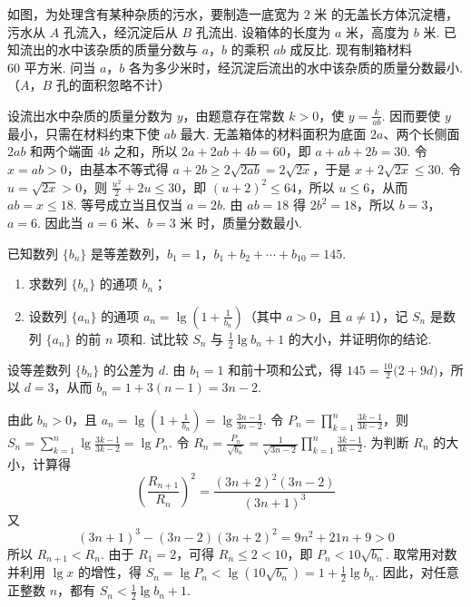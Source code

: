\documentclass[UTF8,a4paper,oneside,11pt]{ctexbook}
\begin{document}
\begin{problem}
如图，为处理含有某种杂质的污水，要制造一底宽为 \(2\text{ 米}\) 的无盖长方体沉淀槽，污水从 \(A\) 孔流入，经沉淀后从 \(B\) 孔流出. 设箱体的长度为 \(a\text{ 米}\)，高度为 \(b\text{ 米}\). 已知流出的水中该杂质的质量分数与 \(a\)，\(b\) 的乘积 \(ab\) 成反比. 现有制箱材料 \(60\text{ 平方米}\). 问当 \(a\)，\(b\) 各为多少米时，经沉淀后流出的水中该杂质的质量分数最小.（\(A\)，\(B\) 孔的面积忽略不计）

\end{problem}

\begin{solution}
设流出水中杂质的质量分数为 \(y\)，由题意存在常数 \(k>0\)，使 \(y=\frac{k}{ab}\). 因而要使 \(y\) 最小，只需在材料约束下使 \(ab\) 最大. 无盖箱体的材料面积为底面 \(2a\)、两个长侧面 \(2ab\) 和两个端面 \(4b\) 之和，所以 \(2a+2ab+4b=60\)，即 \(a+ab+2b=30\). 令 \(x=ab>0\)，由基本不等式得 \(a+2b\geqslant2\sqrt{2ab}=2\sqrt{2x}\)，于是 \(x+2\sqrt{2x}\leqslant30\). 令 \(u=\sqrt{2x}>0\)，则 \(\frac{u^2}{2}+2u\leqslant30\)，即 \((u+2)^2\leqslant64\)，所以 \(u\leqslant6\)，从而 \(ab=x\leqslant18\). 等号成立当且仅当 \(a=2b\). 由 \(ab=18\) 得 \(2b^2=18\)，所以 \(b=3\)，\(a=6\). 因此当 \(a=6\text{ 米}\)、\(b=3\text{ 米}\) 时，质量分数最小.
\end{solution}

\begin{problem}
已知数列 \(\{b_{n}\}\) 是等差数列，\(b_{1} = 1\)，\(b_{1} + b_{2} + \cdots + b_{10} = 145\).

\begin{enumerate}
\item 求数列 \(\{b_{n}\}\) 的通项 \(b_n\)；
\item 设数列 \(\{a_{n}\}\) 的通项 \(a_n = \lg\left(1 + \frac{1}{b_n}\right)\)（其中 \(a > 0\)，且 \(a \neq 1\)），记 \(S_n\) 是数列 \(\{a_n\}\) 的前 \(n\) 项和. 试比较 \(S_n\) 与 \(\frac{1}{2}\lg b_n + 1\) 的大小，并证明你的结论.
\end{enumerate}
\end{problem}

\begin{solution}
设等差数列 \(\{b_n\}\) 的公差为 \(d\). 由 \(b_1=1\) 和前十项和公式，得 \(145=\frac{10}{2}\bigl(2+9d\bigr)\)，所以 \(d=3\)，从而 \(b_n=1+3(n-1)=3n-2\).

由此 \(b_n>0\)，且 \(a_n=\lg\left(1+\frac{1}{b_n}\right)=\lg\frac{3n-1}{3n-2}\). 令
\(P_n=\prod_{k=1}^{n}\frac{3k-1}{3k-2}\)，则
\(S_n=\sum_{k=1}^{n}\lg\frac{3k-1}{3k-2}=\lg P_n\). 令
\(R_n=\frac{P_n}{\sqrt{b_n}}=\frac{1}{\sqrt{3n-2}}\prod_{k=1}^{n}\frac{3k-1}{3k-2}\).
为判断 \(R_n\) 的大小，计算得
\[
\left(\frac{R_{n+1}}{R_n}\right)^2
=\frac{(3n+2)^2(3n-2)}{(3n+1)^3}
\]
又
\[
(3n+1)^3-(3n-2)(3n+2)^2=9n^2+21n+9>0
\]
所以 \(R_{n+1}<R_n\). 由于 \(R_1=2\)，可得 \(R_n\leqslant2<10\)，即
\(P_n<10\sqrt{b_n}\). 取常用对数并利用 \(\lg x\) 的增性，得
\(S_n=\lg P_n<\lg\left(10\sqrt{b_n}\right)=1+\frac{1}{2}\lg b_n\).
因此，对任意正整数 \(n\)，都有 \(S_n<\frac{1}{2}\lg b_n+1\).
\end{solution}

\end{document}
